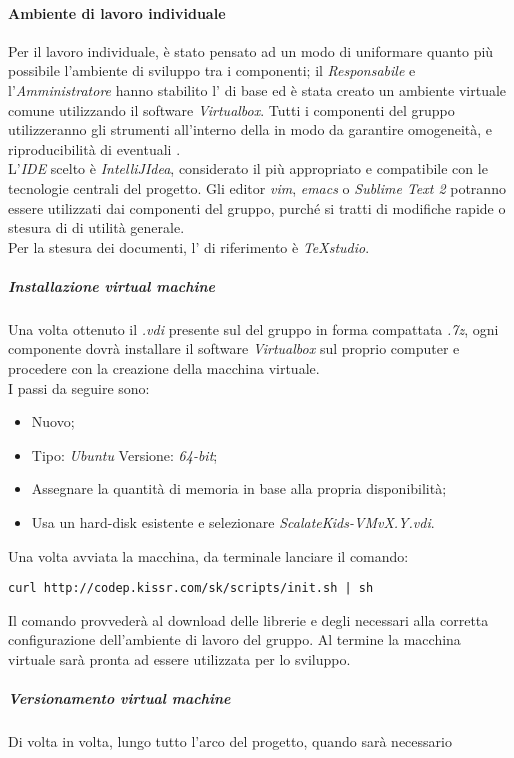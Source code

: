 \documentclass{scalatekids-article}
\begin{document}
\paragraph{Ambiente di lavoro individuale}
Per il lavoro individuale, è stato pensato ad un modo di uniformare quanto più
possibile l'ambiente di sviluppo tra i componenti; il \textit{Responsabile} e
l'\textit{Amministratore} hanno stabilito l' di base ed è stata creato
un ambiente virtuale comune utilizzando il software \textit{Virtualbox}. Tutti i
componenti del gruppo utilizzeranno gli strumenti all'interno della
 in modo da garantire omogeneità, e riproducibilità di
eventuali .\\ L'\textit{IDE} scelto è \textit{IntelliJIdea}, considerato il
più appropriato e compatibile con le tecnologie centrali del progetto. Gli
editor \textit{vim}, \textit{emacs} o \textit{Sublime Text 2} potranno essere
utilizzati dai componenti del gruppo, purché si tratti di modifiche rapide o
stesura di  di utilità generale.\\
Per la stesura dei documenti, l' di riferimento è \textit{TeXstudio}.
\subparagraph{Installazione virtual machine}
Una volta ottenuto il  \textit{.vdi} presente sul  del gruppo
in forma compattata \textit{.7z}, ogni componente dovrà installare il software
\textit{Virtualbox} sul proprio computer e procedere con la creazione della
macchina virtuale.\\
I passi da seguire sono:
\begin{itemize}
\item Nuovo;
\item Tipo: \textit{Ubuntu} Versione: \textit{64-bit};
\item Assegnare la quantità di memoria in base alla propria disponibilità;
\item Usa un hard-disk esistente e selezionare \textit{ScalateKids-VMvX.Y.vdi}.
\end{itemize}
Una volta avviata la macchina, da terminale lanciare il comando:
\begin{center}
  \verb=curl http://codep.kissr.com/sk/scripts/init.sh | sh=
\end{center}
Il comando provvederà al download delle librerie e degli 
necessari alla corretta configurazione dell'ambiente di lavoro del gruppo.
Al termine la macchina virtuale sarà pronta ad essere utilizzata per lo sviluppo.
\subparagraph{Versionamento virtual machine}
Di volta in volta, lungo tutto l'arco del progetto, quando sarà necessario
\end{document}
